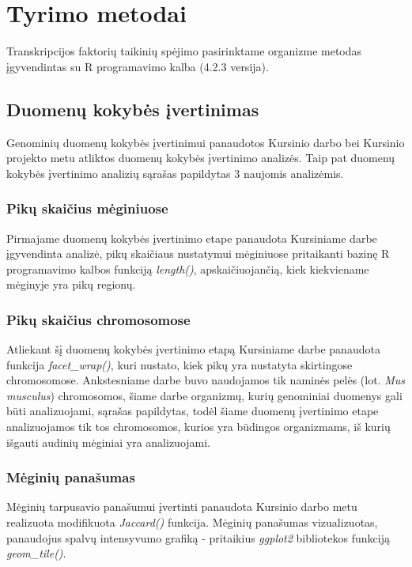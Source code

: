 \documentclass[12pt]{article}
\begin{document}
\newpage


\section{Tyrimo metodai}
Transkripcijos faktorių taikinių spėjimo pasirinktame organizme metodas
įgyvendintas su R programavimo kalba\cite{R} (4.2.3 versija).

\subsection{Duomenų kokybės įvertinimas}
Genominių duomenų kokybės įvertinimui panaudotos Kursinio darbo bei Kursinio
projekto metu atliktos duomenų kokybės įvertinimo analizės. Taip pat
duomenų kokybės įvertinimo analizių sąrašas papildytas 3 naujomis analizėmis.

\subsubsection*{Pikų skaičius mėginiuose}
Pirmajame duomenų kokybės įvertinimo etape panaudota Kursiniame darbe
įgyvendinta analizė, pikų skaičiaus nustatymui mėginiuose pritaikanti bazinę R
programavimo kalbos funkciją \emph{length()}, apskaičiuojančią, kiek kiekviename
mėginyje yra pikų regionų.

\subsubsection*{Pikų skaičius chromosomose}
Atliekant šį duomenų kokybės įvertinimo etapą Kursiniame darbe panaudota
funkcija \emph{facet\_wrap()}, kuri nustato, kiek pikų yra nustatyta skirtingose
chromosomose. Ankstesniame darbe buvo naudojamos tik naminės pelės
(lot. \emph{Mus musculus}) chromosomos, šiame darbe organizmų, kurių genominiai
duomenys gali būti analizuojami, sąrašas papildytas, todėl šiame duomenų
įvertinimo etape analizuojamos tik tos chromosomos, kurios yra būdingos
organizmams, iš kurių išgauti audinių mėginiai yra analizuojami.

\subsubsection*{Mėginių panašumas}
Mėginių tarpusavio panašumui įvertinti panaudota Kursinio darbo metu
realizuota modifikuota \emph{Jaccard()} funkcija. Mėginių panašumas
vizualizuotas, panaudojus spalvų intensyvumo grafiką - pritaikius \emph{ggplot2}
bibliotekos funkciją \emph{geom\_tile()}.
\end{document}
